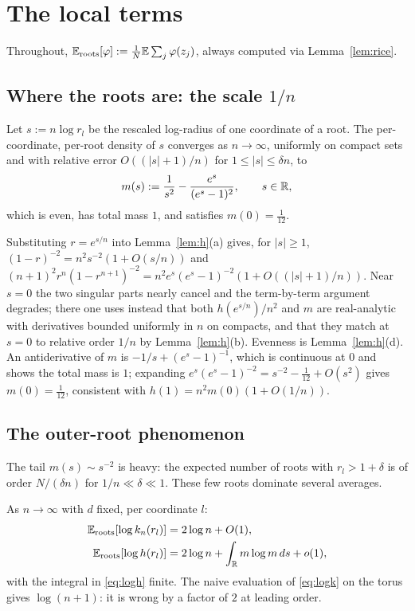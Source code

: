 \section{The local terms}\label{sec:local}

Throughout, $\mathbb{E}_{\mathrm{roots}}[\varphi] := \frac1N\mathbb{E}\sum_j\varphi(z_j)$, always computed via
Lemma~\ref{lem:rice}.

\subsection{Where the roots are: the scale $1/n$}

\begin{proposition}\label{prop:rootscale}
  Let $s := n\log r_l$ be the rescaled log-radius of one coordinate of a root. The
  per-coordinate, per-root density of $s$ converges as $n\to\infty$, uniformly on compact
  sets and with relative error $O((|s|+1)/n)$ for $1\le|s|\le\delta n$, to
  \[
    m(s) := \frac1{s^2} - \frac{e^s}{(e^s-1)^2}, \qquad s\in\mathbb{R},
  \]
  which is even, has total mass $1$, and satisfies $m(0)=\frac1{12}$.
\end{proposition}

\proof
Substituting $r=e^{s/n}$ into Lemma~\ref{lem:h}(a) gives, for $|s|\ge1$,
$(1-r)^{-2} = n^2s^{-2}(1+O(s/n))$ and
$(n+1)^2r^n(1-r^{n+1})^{-2} = n^2e^s(e^s-1)^{-2}(1+O((|s|+1)/n))$. Near $s=0$ the two
singular parts nearly cancel and the term-by-term argument degrades; there one uses instead
that both $h(e^{s/n})/n^2$ and $m$ are real-analytic with derivatives bounded uniformly in
$n$ on compacts, and that they match at $s=0$ to relative order $1/n$ by
Lemma~\ref{lem:h}(b). Evenness is Lemma~\ref{lem:h}(d). An antiderivative of $m$ is
$-1/s + (e^s-1)^{-1}$, which is continuous at $0$ and shows the total mass is $1$; expanding
$e^s(e^s-1)^{-2} = s^{-2} - \frac1{12} + O(s^2)$ gives $m(0)=\frac1{12}$, consistent with
$h(1) = n^2m(0)(1+O(1/n))$.
\endproof

\subsection{The outer-root phenomenon}\label{sec:outer}

The tail $m(s)\sim s^{-2}$ is heavy: the expected number of roots with $r_l>1+\delta$ is of
order $N/(\delta n)$ for $1/n\ll\delta\ll1$. These few roots dominate several averages.

\begin{proposition}\label{prop:outer}
  As $n\to\infty$ with $d$ fixed, per coordinate $l$:
  \begin{align}
    \mathbb{E}_{\mathrm{roots}}[\log k_n(r_l)] &= 2\log n + O(1), \label{eq:logk}\\
    \mathbb{E}_{\mathrm{roots}}[\log h(r_l)] &= 2\log n + \int_{\mathbb{R}} m\log m\,ds + o(1), \label{eq:logh}
  \end{align}
  with the integral in \eqref{eq:logh} finite. The naive evaluation of \eqref{eq:logk} on the
  torus gives $\log(n+1)$: it is wrong by a factor of $2$ at leading order.
\end{proposition}

